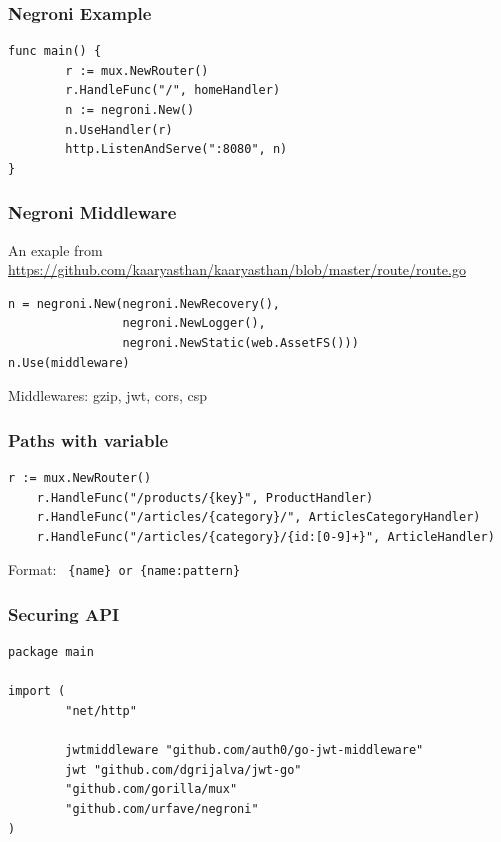 \documentclass[aspectratio=169]{beamer}
\begin{document}
\begin{frame}[fragile]
  \frametitle{Negroni Example}

\begin{Verbatim}[fontsize=\tiny]
func main() {
        r := mux.NewRouter()
        r.HandleFunc("/", homeHandler)
        n := negroni.New()
        n.UseHandler(r)
        http.ListenAndServe(":8080", n)
}
\end{Verbatim}
\end{frame}

\begin{frame}[fragile]
  \frametitle{Negroni Middleware}

  An exaple from \small{\url{https://github.com/kaaryasthan/kaaryasthan/blob/master/route/route.go}}
  
\begin{Verbatim}[fontsize=\tiny]
n = negroni.New(negroni.NewRecovery(),
                negroni.NewLogger(),
                negroni.NewStatic(web.AssetFS()))
n.Use(middleware)
\end{Verbatim}
Middlewares: gzip, jwt, cors, csp
\end{frame}


\begin{frame}[fragile]
  \frametitle{Paths with variable}

  \begin{Verbatim}[fontsize=\tiny]
    r := mux.NewRouter()
    r.HandleFunc("/products/{key}", ProductHandler)
    r.HandleFunc("/articles/{category}/", ArticlesCategoryHandler)
    r.HandleFunc("/articles/{category}/{id:[0-9]+}", ArticleHandler)
\end{Verbatim}

  Format:
  \texttt{ \{name\} or \{name:pattern\}}

\end{frame}

\begin{frame}[fragile]
  \frametitle{Securing API}

  \begin{Verbatim}[fontsize=\tiny]
package main

import (
        "net/http"

        jwtmiddleware "github.com/auth0/go-jwt-middleware"
        jwt "github.com/dgrijalva/jwt-go"
        "github.com/gorilla/mux"
        "github.com/urfave/negroni"
)
\end{Verbatim}

\end{frame}
\end{document}
